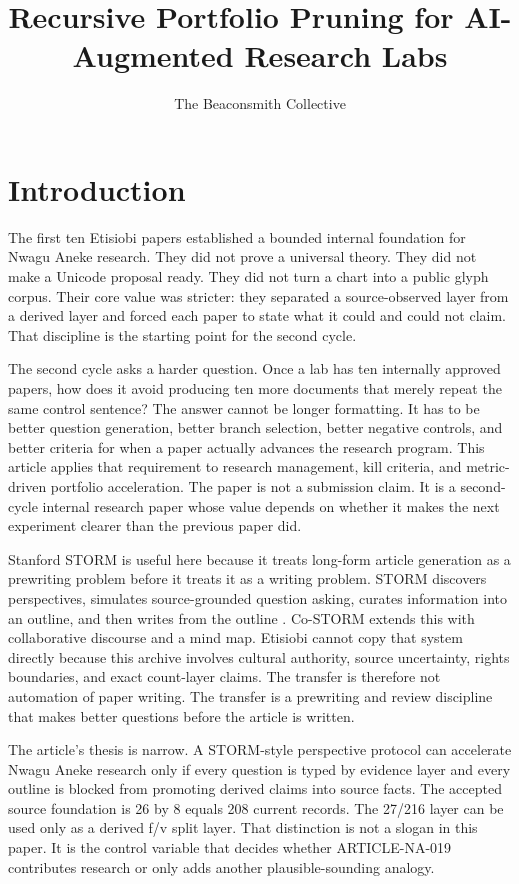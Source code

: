 \documentclass[sigconf,nonacm]{acmart}
\title{Recursive Portfolio Pruning for AI-Augmented Research Labs}
\author{The Beaconsmith Collective}
\affiliation{\institution{Etisiobi Research Studio}\city{Enugu}\country{Nigeria}}
\begin{document}
\maketitle

\section{Introduction}
The first ten Etisiobi papers established a bounded internal foundation for
Nwagu Aneke research. They did not prove a universal theory. They did not make a
Unicode proposal ready. They did not turn a chart into a public glyph corpus.
Their core value was stricter: they separated a source-observed layer from a
derived layer and forced each paper to state what it could and could not claim.
That discipline is the starting point for the second cycle.

The second cycle asks a harder question. Once a lab has ten internally approved
papers, how does it avoid producing ten more documents that merely repeat the
same control sentence? The answer cannot be longer formatting. It has to be
better question generation, better branch selection, better negative controls,
and better criteria for when a paper actually advances the research program.
This article applies that requirement to research management, kill criteria, and metric-driven portfolio acceleration. The paper is not a submission
claim. It is a second-cycle internal research paper whose value depends on
whether it makes the next experiment clearer than the previous paper did.

Stanford STORM is useful here because it treats long-form article generation as
a prewriting problem before it treats it as a writing problem. STORM discovers
perspectives, simulates source-grounded question asking, curates information
into an outline, and then writes from the outline \cite{shao2024storm,jiang2024costorm,gao2023alce,wadden2020scifact}. Co-STORM
extends this with collaborative discourse and a mind map. Etisiobi cannot copy
that system directly because this archive involves cultural authority, source
uncertainty, rights boundaries, and exact count-layer claims. The transfer is
therefore not automation of paper writing. The transfer is a prewriting and
review discipline that makes better questions before the article is written.

The article's thesis is narrow. A STORM-style perspective protocol can accelerate
Nwagu Aneke research only if every question is typed by evidence layer and every
outline is blocked from promoting derived claims into source facts. The accepted
source foundation is 26 by 8 equals 208 current records. The 27/216 layer can be
used only as a derived f/v split layer. That distinction is not a slogan in this
paper. It is the control variable that decides whether ARTICLE-NA-019 contributes
research or only adds another plausible-sounding analogy.
\end{document}
